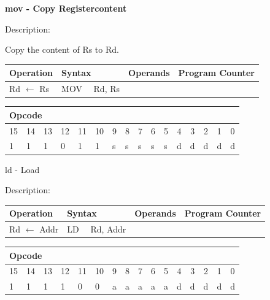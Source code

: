 \documentclass[%
	pdftex,
	a4paper,
	oneside,
	bibtotoc,%
	idxtotoc,%
	bibtotocnumbered,
	halfparskip,%
]{scrbook}
\begin{document}
\bigskip

\textbf{mov - Copy Registercontent}

Description:

Copy the content of Rs to Rd.

\begin{tabular}{|l|l|l|l|}
\hline
Operation & Syntax & Operands & Program Counter \\ \hline
Rd $\leftarrow $ Rs & MOV \ \ Rd, Rs &  &  \\ \hline
\end{tabular}

\begin{tabular}{|c|c|c|c|c|c|c|c|c|c|c|c|c|c|c|c|}
\hline
\multicolumn{6}{|l|}{Opcode} & \multicolumn{5}{|l|}{} & \multicolumn{5}{|l|}{
} \\ \hline
15 & 14 & 13 & 12 & 11 & 10 & 9 & 8 & 7 & 6 & 5 & 4 & 3 & 2 & 1 & 0 \\ \hline
\multicolumn{1}{|l|}{1} & \multicolumn{1}{|l|}{1} & \multicolumn{1}{|l|}{1}
& \multicolumn{1}{|l|}{0} & \multicolumn{1}{|l|}{1} & \multicolumn{1}{|l|}{1}
& \multicolumn{1}{|l|}{s} & \multicolumn{1}{|l|}{s} & \multicolumn{1}{|l|}{s}
& \multicolumn{1}{|l|}{s} & \multicolumn{1}{|l|}{s} & \multicolumn{1}{|l|}{d}
& \multicolumn{1}{|l|}{d} & \multicolumn{1}{|l|}{d} & \multicolumn{1}{|l|}{d}
& \multicolumn{1}{|l|}{d} \\ \hline
\end{tabular}

\bigskip

ld - Load

Description:

\begin{tabular}{|l|l|l|l|}
\hline
Operation & Syntax & Operands & Program Counter \\ \hline
Rd $\leftarrow $ Addr & LD \ \ Rd, Addr &  &  \\ \hline
\end{tabular}

\begin{tabular}{|c|c|c|c|c|c|c|c|c|c|c|c|c|c|c|c|}
\hline
\multicolumn{6}{|l|}{Opcode} & \multicolumn{5}{|l|}{} & \multicolumn{5}{|l|}{
} \\ \hline
15 & 14 & 13 & 12 & 11 & 10 & 9 & 8 & 7 & 6 & 5 & 4 & 3 & 2 & 1 & 0 \\ \hline
\multicolumn{1}{|l|}{1} & \multicolumn{1}{|l|}{1} & \multicolumn{1}{|l|}{1}
& \multicolumn{1}{|l|}{1} & \multicolumn{1}{|l|}{0} & \multicolumn{1}{|l|}{0}
& \multicolumn{1}{|l|}{a} & \multicolumn{1}{|l|}{a} & \multicolumn{1}{|l|}{a}
& \multicolumn{1}{|l|}{a} & \multicolumn{1}{|l|}{a} & \multicolumn{1}{|l|}{d}
& \multicolumn{1}{|l|}{d} & \multicolumn{1}{|l|}{d} & \multicolumn{1}{|l|}{d}
& \multicolumn{1}{|l|}{d} \\ \hline
\end{tabular}
\end{document}
